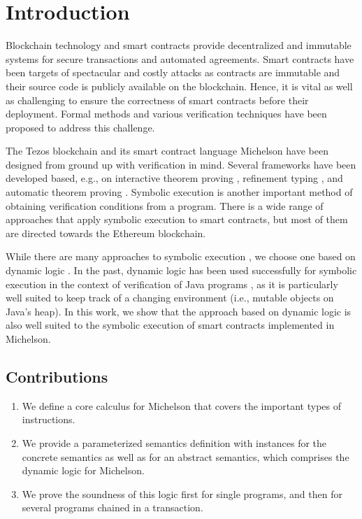 \section{Introduction}
\label{sec:introduction}

Blockchain technology and smart contracts provide decentralized and
immutable systems for secure transactions and automated agreements.
Smart contracts have been targets of spectacular and costly attacks as
contracts are immutable and their source code is publicly available on
the blockchain. 
Hence, it is vital as well as challenging to ensure the correctness of smart contracts
before their deployment. Formal methods and various verification
techniques have been proposed to address this challenge.

The Tezos blockchain \cite{tezos-whitepaper} and its smart contract
language Michelson have been designed from
ground up with verification in mind. Several frameworks have been
developed based, e.g., on interactive theorem proving \cite{micho},
refinement typing \cite{helmholtz-from-thesis}, and automatic theorem
proving \cite{WHYtool}. 
Symbolic execution is another important method of obtaining verification
conditions from a program. There is a wide range of approaches that
apply symbolic execution to smart contracts, but most of them are
directed towards the Ethereum blockchain.

While there are many approaches to symbolic execution \cite{...}, we
choose one based on dynamic logic \cite{DL}. In the past, dynamic
logic has been used successfully for symbolic execution in the context
of verification of Java programs \cite{KeY3}, as it is particularly
well suited to keep track of a changing environment (i.e., mutable
objects on Java's heap). 
In this work, we show that the approach based on dynamic logic is also
well suited to the symbolic execution of smart contracts implemented
in Michelson.

\subsection*{Contributions}
\label{sec:contributions}

\begin{enumerate}
\item We define a core calculus for Michelson that covers
  the important types of instructions.
\item We provide a parameterized semantics definition with instances
  for the concrete semantics as well as for an abstract semantics,
  which comprises the dynamic logic for Michelson. 
\item We prove the soundness of this logic first for single programs,
  and then for several programs chained in a transaction.
\end{enumerate}

